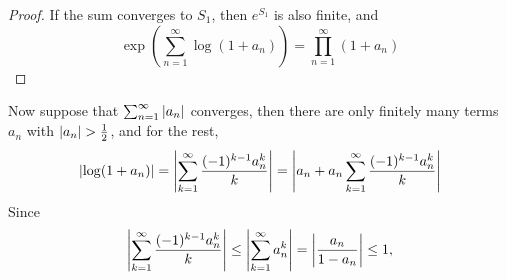 \documentclass{homework}
\begin{document}
\begin{solution}
\begin{lemma}
                                                                                                                                      \end{lemma}
                                                                                                                                      \begin{proof}
                                                                                                                                      If the sum converges to $S_1$, then $e^{S_1}$ is also finite, and
                                                                                                                                      \[
                                                                                                                                      \exp(\sum_{n=1}^\infty \log(1 + a_n)) = \prod_{n=1}^\infty (1 + a_n)
                                                                                                                                      \]
                                                                                                                                      \end{proof}
                                                                                                                                      Now suppose that $\sum_{n=1}^\infty \left|a_n\right|$ converges, then there are only finitely many terms $a_n$ with $\abs{a_n}>\frac{1}{2}$, and for the rest,
                                                                                                                                      \[
                                                                                                                                      \left|\log(1 + a_n)\right| = \left|\sum_{k=1}^\infty \frac{(-1)^{k-1}a_n^k}{k}\right| = \left|a_n + a_n\sum_{k=1}^\infty \frac{(-1)^{k-1}a_n^k}{k}\right|
                                                                                                                                      \]
                                                                                                                                      Since
                                                                                                                                      \[
                                                                                                                                      \left|\sum_{k=1}^\infty \frac{(-1)^{k-1}a_n^k}{k}\right|\leq 
                                                                                                                                      \left|\sum_{k=1}^\infty a_n^k\right| = \left|\frac{a_n}{1-a_n}\right| \leq 1,
\]
\end{solution}
\end{document}
